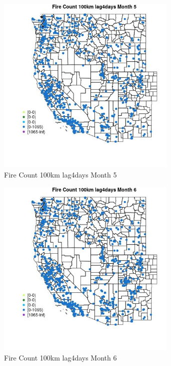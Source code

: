 \begin{figure} 
\centering  
\includegraphics[width=0.77\textwidth]{Code_Outputs/Report_ML_input_PM25_Step4_part_f_de_duplicated_aveswNAs_MapObsMo5Fire_Count_100km_lag4days.jpg} 
\caption{\label{fig:Report_ML_input_PM25_Step4_part_f_de_duplicated_aveswNAsMapObsMo5Fire_Count_100km_lag4days}Fire Count 100km lag4days Month 5} 
\end{figure} 
 

\begin{figure} 
\centering  
\includegraphics[width=0.77\textwidth]{Code_Outputs/Report_ML_input_PM25_Step4_part_f_de_duplicated_aveswNAs_MapObsMo6Fire_Count_100km_lag4days.jpg} 
\caption{\label{fig:Report_ML_input_PM25_Step4_part_f_de_duplicated_aveswNAsMapObsMo6Fire_Count_100km_lag4days}Fire Count 100km lag4days Month 6} 
\end{figure} 
 


